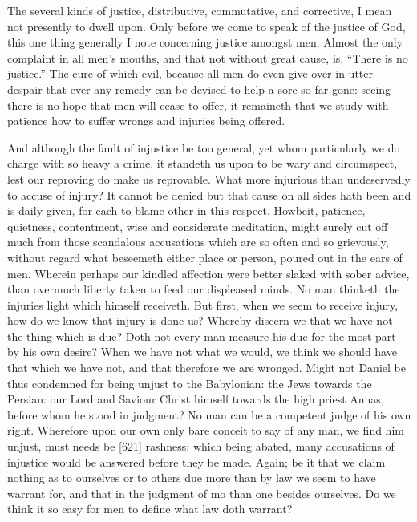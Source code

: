 The several kinds of justice, distributive, commutative, and corrective, I mean not presently to dwell upon. Only before we come to speak of the justice of God, this one thing generally I note concerning justice amongst men. Almost the only complaint in all men’s mouths, and that not without great cause, is, “There is no justice.” The cure of which evil, because all men do even give over in utter despair that ever any remedy can be devised to help a sore so far gone: seeing there is no hope that men will cease to offer, it remaineth that we study with patience how to suffer wrongs and injuries being offered.

And although the fault of injustice be too general, yet whom particularly we do charge with so heavy a crime, it standeth us upon to be wary and circumspect, lest our reproving do make us reprovable. What more injurious than undeservedly to accuse of injury? It cannot be denied but that cause on all sides hath been and is daily given, for each to blame other in this respect. Howbeit, patience, quietness, contentment, wise and considerate meditation, might surely cut off much from those scandalous accusations which are so often and so grievously, without regard what beseemeth either place or person, poured out in the ears of men. Wherein perhaps our kindled affection were better slaked with sober advice, than overmuch liberty taken to feed our displeased minds. No man thinketh the injuries light which himself receiveth. But first, when we seem to receive injury, how do we know that injury is done us? Whereby discern we that we have not the thing which is due? Doth not every man measure his due for the most part by his own desire? When we have not what we would, we think we should have that which we have not, and that therefore we are wronged. Might not Daniel be thus condemned for being unjust to the Babylonian: the Jews towards the Persian: our Lord and Saviour Christ himself towards the high priest Annas, before whom he stood in judgment? No man can be a competent judge of his own right. Wherefore upon our own only bare conceit to say of any man, we find him unjust, must needs be [621] rashness: which being abated, many accusations of injustice would be answered before they be made. Again; be it that we claim nothing as to ourselves or to others due more than by law we seem to have warrant for, and that in the judgment of mo than one besides ourselves. Do we think it so easy for men to define what law doth warrant?

